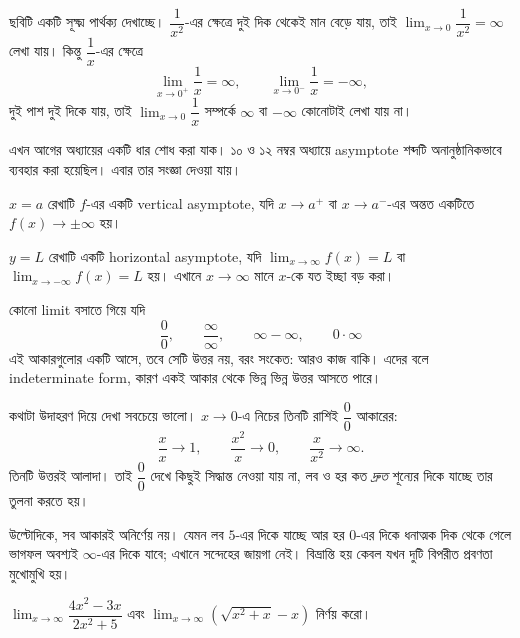 \documentclass[11pt]{article}
\begin{document}
ছবিটি একটি সূক্ষ্ম পার্থক্য দেখাচ্ছে। $\dfrac{1}{x^{2}}$-এর ক্ষেত্রে দুই দিক
থেকেই মান বেড়ে যায়, তাই
$\lim_{x \to 0} \dfrac{1}{x^{2}} = \infty$ লেখা যায়। কিন্তু $\dfrac{1}{x}$-এর
ক্ষেত্রে
\[
  \lim_{x \to 0^{+}} \frac{1}{x} = \infty, \qquad
  \lim_{x \to 0^{-}} \frac{1}{x} = -\infty ,
\]
দুই পাশ দুই দিকে যায়, তাই $\lim_{x \to 0} \dfrac{1}{x}$ সম্পর্কে
$\infty$ বা $-\infty$ কোনোটাই লেখা যায় না।

এখন আগের অধ্যায়ের একটি ধার শোধ করা যাক। ১০ ও ১২ নম্বর অধ্যায়ে
asymptote শব্দটি অনানুষ্ঠানিকভাবে ব্যবহার করা হয়েছিল। এবার তার সংজ্ঞা দেওয়া
যায়।

\begin{idea}[Asymptote, সংজ্ঞাসহ]
$x = a$ রেখাটি $f$-এর একটি vertical asymptote, যদি $x \to a^{+}$ বা
$x \to a^{-}$-এর অন্তত একটিতে $f(x) \to \pm\infty$ হয়।

$y = L$ রেখাটি একটি horizontal asymptote, যদি
$\lim_{x \to \infty} f(x) = L$ বা $\lim_{x \to -\infty} f(x) = L$ হয়। এখানে
$x \to \infty$ মানে $x$-কে যত ইচ্ছা বড় করা।
\end{idea}

\begin{idea}
কোনো limit বসাতে গিয়ে যদি
\[
  \frac{0}{0}, \qquad \frac{\infty}{\infty}, \qquad
  \infty - \infty, \qquad 0 \cdot \infty
\]
এই আকারগুলোর একটি আসে, তবে সেটি উত্তর নয়, বরং সংকেত: আরও কাজ বাকি। এদের বলে
indeterminate form, কারণ একই আকার থেকে ভিন্ন ভিন্ন উত্তর আসতে পারে।
\end{idea}

কথাটা উদাহরণ দিয়ে দেখা সবচেয়ে ভালো। $x \to 0$-এ নিচের তিনটি রাশিই $\dfrac{0}{0}$
আকারের:
\[
  \frac{x}{x} \to 1, \qquad
  \frac{x^{2}}{x} \to 0, \qquad
  \frac{x}{x^{2}} \to \infty .
\]
তিনটি উত্তরই আলাদা। তাই $\dfrac{0}{0}$ দেখে কিছুই সিদ্ধান্ত নেওয়া যায় না,
লব ও হর কত \emph{দ্রুত} শূন্যের দিকে যাচ্ছে তার তুলনা করতে হয়।

উল্টোদিকে, সব আকারই অনির্ণেয় নয়। যেমন লব $5$-এর দিকে যাচ্ছে আর হর $0$-এর
দিকে ধনাত্মক দিক থেকে গেলে ভাগফল অবশ্যই $\infty$-এর দিকে যাবে; এখানে সন্দেহের
জায়গা নেই। বিভ্রান্তি হয় কেবল যখন দুটি বিপরীত প্রবণতা মুখোমুখি হয়।

\begin{example}
$\lim_{x \to \infty} \dfrac{4x^{2}-3x}{2x^{2}+5}$ এবং
$\lim_{x \to \infty} \left( \sqrt{x^{2}+x} - x \right)$ নির্ণয় করো।
\end{example}
\end{document}
